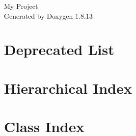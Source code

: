 \documentclass[twoside]{book}
\newcommand{\+}{\discretionary{\mbox{\scriptsize$\hookleftarrow$}}{}{}}
\newcommand{\clearemptydoublepage}{%
  \newpage{\pagestyle{empty}\cleardoublepage}%
}
\begin{document}
\hypersetup{pageanchor=false,
             bookmarksnumbered=true,
             pdfencoding=unicode
            }
\begin{titlepage}
\vspace*{7cm}
\begin{center}%
{\Large My Project }\\
\vspace*{1cm}
{\large Generated by Doxygen 1.8.13}\\
\end{center}
\end{titlepage}
\clearemptydoublepage
{}
\tableofcontents
\clearemptydoublepage
{}
\hypersetup{pageanchor=true}

\chapter{Deprecated List}
\label{deprecated}

\chapter{Hierarchical Index}

\chapter{Class Index}

\end{document}
